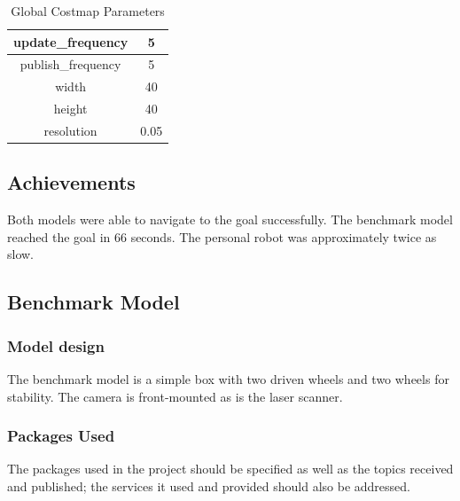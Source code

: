 \documentclass[10pt,journal,compsoc]{IEEEtran}
\begin{document}
\begin{table}[h]
\caption{Global Costmap Parameters}
\label{table_example}
\begin{center}
\begin{tabular}{|c|c|}
\hline
update\_frequency & 5\\
\hline
publish\_frequency & 5\\
\hline
width & 40\\
\hline
height & 40\\
\hline
resolution & 0.05\\
\hline
\hline
\end{tabular}
\end{center}
\end{table}
      
\subsection{Achievements}
Both models were able to navigate to the goal successfully. The benchmark model reached the goal in 66 seconds. The personal robot was approximately twice as slow.

\subsection{Benchmark Model}
\subsubsection{Model design}
The benchmark model is a simple box with two driven wheels and two wheels for stability. The camera is front-mounted as is the laser scanner.
\subsubsection{Packages Used}
The packages used in the project should be specified as well as the topics received and published; the services it used and provided should also be addressed.
\end{document}
